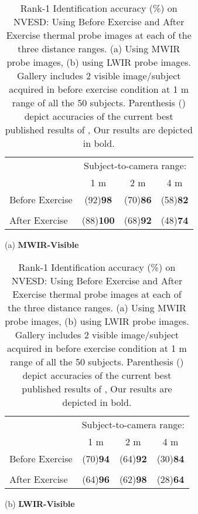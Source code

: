 \documentclass[smallextended,natbib]{svjour3}       \usepackage{graphicx}
\begin{document}
\begin{table}[t]
\begin{minipage}[t]{0.40\textwidth} 
\begin{tabular}{@{}lccc@{}}
\toprule
                                 & \multicolumn{3}{c}{Subject-to-camera range:} \\ \cmidrule(l){2-4} 
                                 & 1 m         & 2 m        & 4 m   \\ \midrule
Before Exercise 	&(92)\textbf{98}			&(70)\textbf{86}				&(58)\textbf{82} \\ 	 
\\
After Exercise             & (88)\textbf{100}              & (68)\textbf{92}             &(48)\textbf{74}                   
\\ \bottomrule
\end{tabular}
\begin{center} (a) \textbf{MWIR-Visible} \end{center}
\end{minipage}
\hfill
\begin{minipage}[t]{0.40\textwidth}
\begin{tabular}{@{}lccc@{}}
\toprule
                                 & \multicolumn{3}{c}{Subject-to-camera range:} \\ \cmidrule(l){2-4} 
                                 & 1 m         & 2 m        & 4 m   \\ \midrule
Before Exercise 	&(70)\textbf{94}			&(64)\textbf{92}				&(30)\textbf{84} \\ 	 
\\
After Exercise             & (64)\textbf{96}              & (62)\textbf{98}             &(28)\textbf{64}                   
\\ \bottomrule
\end{tabular}
\begin{center} (b) \textbf{LWIR-Visible} \end{center}
\end{minipage}
\caption{Rank-1 Identification accuracy (\%) on NVESD: Using Before Exercise and After Exercise thermal probe images at each of the three distance ranges. (a) Using MWIR probe images, (b) using LWIR probe images. Gallery includes 2 visible image/subject acquired in before exercise condition at 1 m range of all the 50 subjects. Parenthesis () depict accuracies of the current best published results of \cite{hu2015}, Our results are depicted in bold.}
\label{table:3}
\end{table}
\end{document}
